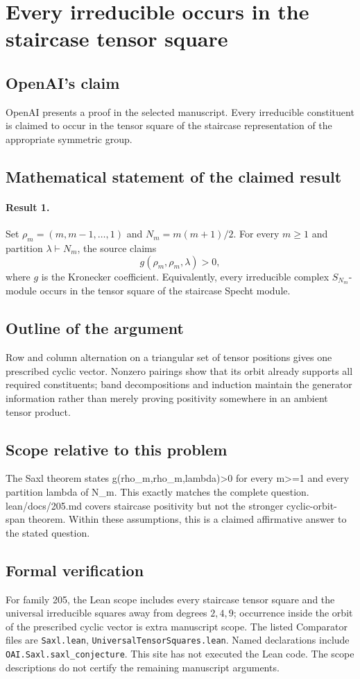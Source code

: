 \documentclass[11pt]{article}
\begin{document}
\section*{Every irreducible occurs in the staircase tensor square}

\subsection{OpenAI's claim}
OpenAI presents a proof in the selected manuscript. Every irreducible constituent is claimed to occur in the tensor square of the staircase representation of the appropriate symmetric group.

\subsection{Mathematical statement of the claimed result}
\paragraph{Result 1.} Set \(\rho_m=(m,m-1,\ldots,1)\) and \(N_m=m(m+1)/2\). For every \(m\ge1\) and partition \(\lambda\vdash N_m\), the source claims
\[
 g(\rho_m,\rho_m,\lambda)>0,
\]
where \(g\) is the Kronecker coefficient. Equivalently, every irreducible complex \(S_{N_m}\)-module occurs in the tensor square of the staircase Specht module.

\subsection{Outline of the argument}
Row and column alternation on a triangular set of tensor positions gives one prescribed cyclic vector. Nonzero pairings show that its orbit already supports all required constituents; band decompositions and induction maintain the generator information rather than merely proving positivity somewhere in an ambient tensor product.

\subsection{Scope relative to this problem}
The Saxl theorem states g(rho\_m,rho\_m,lambda)>0 for every m>=1 and every partition lambda of N\_m. This exactly matches the complete question. lean/docs/205.md covers staircase positivity but not the stronger cyclic-orbit-span theorem. Within these assumptions, this is a claimed affirmative answer to the stated question.

\subsection{Formal verification}
For family 205, the Lean scope includes every staircase tensor square and the universal irreducible squares away from degrees $2,4,9$; occurrence inside the orbit of the prescribed cyclic vector is extra manuscript scope. The listed Comparator files are \texttt{Saxl.lean}, \texttt{UniversalTensorSquares.lean}. Named declarations include \texttt{OAI.Saxl.saxl\_conjecture}. This site has not executed the Lean code. The scope descriptions do not certify the remaining manuscript arguments.
\end{document}

